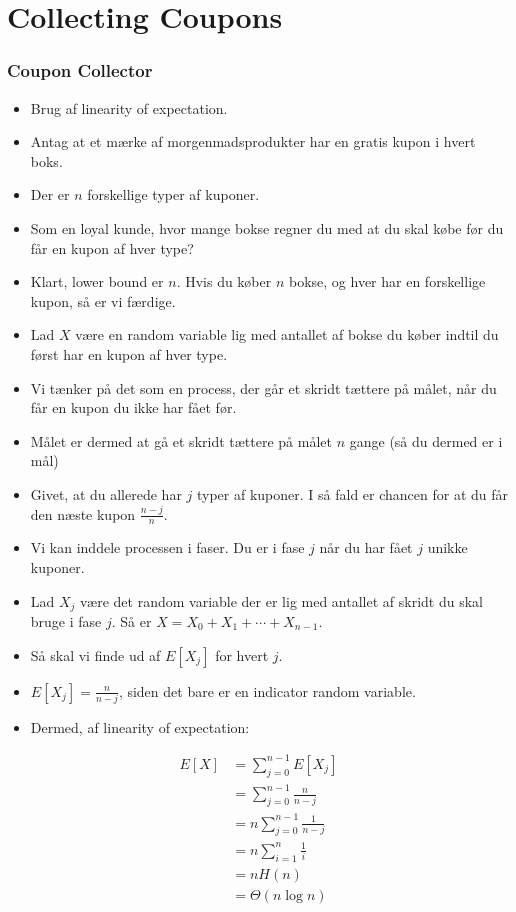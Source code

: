 \documentclass{beamer}
\begin{document}
\section{Collecting Coupons}
\label{sec:coupons}

\begin{frame}[allowframebreaks]
  \frametitle{Coupon Collector}
 \begin{itemize}
 \item Brug af linearity of expectation. 
 \item Antag at et mærke af morgenmadsprodukter har en gratis kupon i hvert boks.
 \item Der er $n$ forskellige typer af kuponer.
 \item Som en loyal kunde, hvor mange bokse regner du med at du skal købe før du får en kupon af hver type? 
 \item Klart, lower bound er $n$. Hvis du køber $n$ bokse, og hver har en forskellige kupon, så er vi færdige. 
 \item Lad $X$ være en random variable lig med antallet af bokse du køber indtil du først har en kupon af hver type.
 \item Vi tænker på det som en process, der går et skridt tættere på målet, når du får en kupon du ikke har fået før.
 \item Målet er dermed at gå et skridt tættere på målet $n$ gange (så du dermed er i mål)
 \item Givet, at du allerede har $j$ typer af kuponer. I så fald er chancen for at du får den næste kupon $\frac{n-j}{n}$. 
 \item Vi kan inddele processen i faser. Du er i fase $j$ når du har fået $j$ unikke kuponer. 
 \item Lad $X_j$ være det random variable der er lig med antallet af skridt du skal bruge i fase $j$. Så er $X = X_{0} + X_{1} + \cdots + X_{n-1}$.
 \item Så skal vi finde ud af $E[X_{j}]$ for hvert $j$.
 \item $E[X_j] = \frac{n}{n-j}$, siden det bare er en indicator random variable.
 \item Dermed, af linearity of expectation:
 \end{itemize} 
\begin{equation}
\begin{split}
  E[X] &= \sum_{j=0}^{n-1} E[X_{j}]\\
       &= \sum_{j=0}^{n-1} \frac{n}{n-j}\\
       &= n \sum_{j=0}^{n-1} \frac{1}{n-j}\\
       &= n \sum_{i=1}^{n} \frac{1}{i} \\
       &= nH(n) \\
       &= \Theta (n \log n)\\
\end{split}
\end{equation}
\end{frame}
\end{document}

